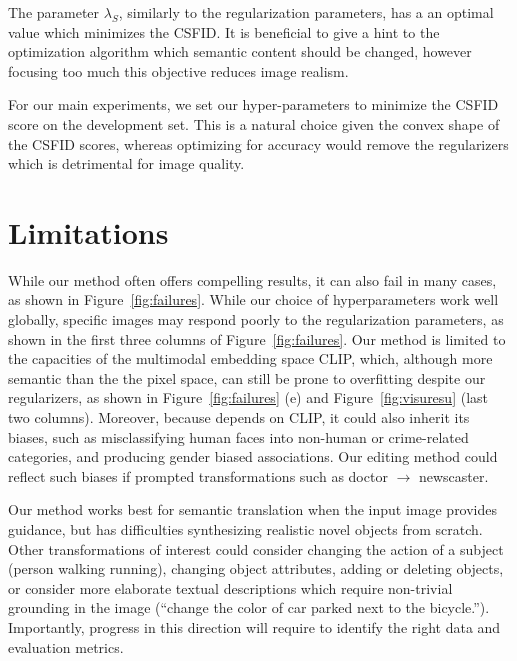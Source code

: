 The parameter $\lambda_S$, similarly to the regularization parameters, has a an optimal
 value which minimizes the \ac{CSFID}. It is beneficial to give a hint to the optimization 
 algorithm which semantic content should be changed, however focusing too much this 
 objective reduces image realism.

For our main experiments, we set our hyper-parameters to  minimize the \ac{CSFID} score on 
the development set. This is a natural choice given the convex shape of the \ac{CSFID} 
scores, whereas optimizing for accuracy  would   remove the regularizers which is 
detrimental for image quality.


\section{Limitations}

While our method  often offers compelling results, it can also fail in many cases, 
as shown in Figure~\ref{fig:failures}. While our choice of hyperparameters work well 
globally, specific images may respond poorly to the regularization parameters, as shown 
in the first three columns of Figure~\ref{fig:failures}. Our method is limited to the capacities 
of the multimodal embedding space \ac{CLIP}, which, although more semantic than the the pixel space, 
can still be prone to overfitting despite our regularizers, as shown in Figure~\ref{fig:failures} (e) 
and Figure~\ref{fig:visuresu} (last two columns). Moreover, because \ours depends on \ac{CLIP}, 
it could also inherit its biases,
such as misclassifying human faces into non-human or crime-related categories, and 
producing gender biased associations. Our editing method could reflect such biases if 
prompted transformations such as doctor $\rightarrow$ newscaster.

Our method 
works best for semantic translation when the input image provides guidance,
 but has difficulties synthesizing realistic novel objects from scratch. Other transformations 
 of interest could consider changing the 
action of a subject (person walking \vs  running), changing object attributes, 
adding or deleting objects, or consider more elaborate textual descriptions which 
require non-trivial grounding in the image (``change the color of car parked next to 
the bicycle.''). Importantly, progress in this direction will require to identify the 
right data and evaluation metrics. 


